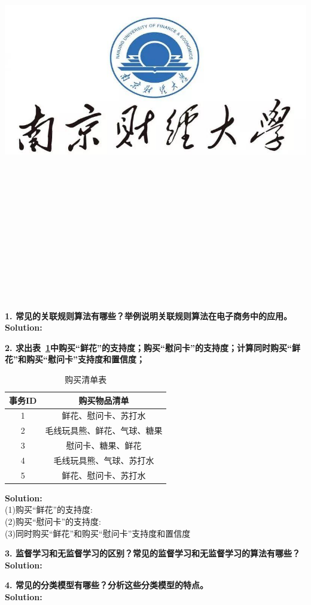 \documentclass{article}
\title{
	\includegraphics[scale = 0.45]{images/title/ucas-logo1.png}\\
    \vspace{1in}
    \textmd{\textbf{\hmwkClass\ \hmwkTitle}}\\
    \textmd{\textbf{\hmwkSubTitle}}\\
    \normalsize\vspace{0.1in}\small{\hmwkCompleteTime }\\
    \vspace{0.1in}\large{\textit{\hmwkClassInstructor\ }}\\
    \vspace{3in}
}
\author{\hmwkAuthorName \\ 
	\hmwkAuthorStuID}
\date{}
\begin{document}
\maketitle


%


\pagebreak

\begin{homeworkProblem}
\textbf{1.	常见的关联规则算法有哪些？举例说明关联规则算法在电子商务中的应用。}\\
	\textbf{Solution:}\\
	{\color{blue}	
  
    }
\end{homeworkProblem}
\pagebreak

\begin{homeworkProblem}
	\textbf{2. 求出表~\ref{coldstartuser}中购买“鲜花”的支持度；购买“慰问卡”的支持度；计算同时购买“鲜花”和购买“慰问卡”支持度和置信度；
	}\\
	\begin{table}[htbp!]
		\centering
		\caption{购买清单表}
		\label{coldstartuser}
		\begin{tabular}{c|c}
			\hline
			事务ID & 购买物品清单   \\
			\hline
			1   & 鲜花、慰问卡、苏打水    \\
			2  & 毛线玩具熊、鲜花、气球、糖果 \\
			3  & 慰问卡、糖果、鲜花     \\
			4 & 毛线玩具熊、气球、苏打水	 \\
			5 &  鲜花、慰问卡、苏打水 \\
			\hline
		\end{tabular}%
	\end{table}
	\textbf{Solution:}\\
	{\color{blue}	
	(1)购买“鲜花”的支持度:     \\
	(2)购买“慰问卡”的支持度:         \\
	(3)同时购买“鲜花”和购买“慰问卡”支持度和置信度 \\
    }
	
\end{homeworkProblem}


\pagebreak

\begin{homeworkProblem}
\textbf{3.	监督学习和无监督学习的区别？常见的监督学习和无监督学习的算法有哪些？}\\
\textbf{Solution:}\\
{\color{blue}

}


\end{homeworkProblem}
\pagebreak

\begin{homeworkProblem}
\textbf{4. 常见的分类模型有哪些？分析这些分类模型的特点。}\\
\textbf{Solution:}\\
{\color{blue}

}
\end{homeworkProblem}



\end{document}
